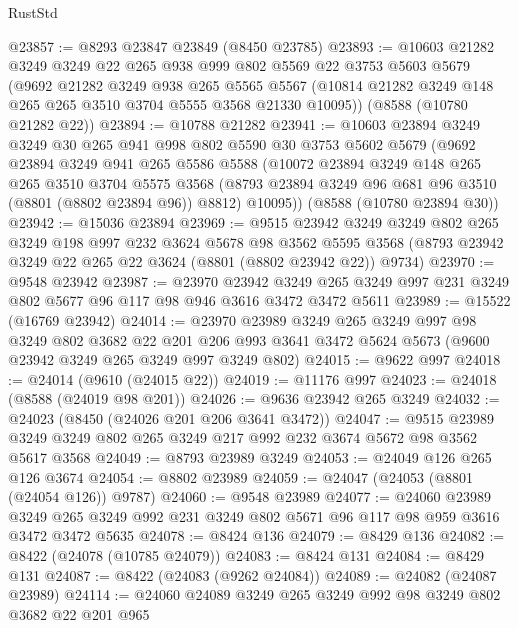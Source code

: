 \begin{lexlean}{RustStd}
\begin{coremodule}
@23857 := @8293 @23847 @23849 (@8450 @23785)
@23893 := @10603
    @21282
    @3249
    @3249
    @22
    @265
    @938
    @999
    @802
    @5569
    @22
    @3753
    @5603
    @5679
    (@9692
      @21282
      @3249
      @938
      @265
      @5565
      @5567
      (@10814 @21282 @3249 @148 @265 @265 @3510 @3704 @5555 @3568 @21330 @10095))
    (@8588 (@10780 @21282 @22))
@23894 := @10788 @21282
@23941 := @10603
    @23894
    @3249
    @3249
    @30
    @265
    @941
    @998
    @802
    @5590
    @30
    @3753
    @5602
    @5679
    (@9692
      @23894
      @3249
      @941
      @265
      @5586
      @5588
      (@10072
        @23894
        @3249
        @148
        @265
        @265
        @3510
        @3704
        @5575
        @3568
        (@8793 @23894 @3249 @96 @681 @96 @3510 (@8801 (@8802 @23894 @96)) @8812)
        @10095))
    (@8588 (@10780 @23894 @30))
@23942 := @15036 @23894
@23969 := @9515
    @23942
    @3249
    @3249
    @802
    @265
    @3249
    @198
    @997
    @232
    @3624
    @5678
    @98
    @3562
    @5595
    @3568
    (@8793 @23942 @3249 @22 @265 @22 @3624 (@8801 (@8802 @23942 @22)) @9734)
@23970 := @9548 @23942
@23987 := @23970
    @23942
    @3249
    @265
    @3249
    @997
    @231
    @3249
    @802
    @5677
    @96
    @117
    @98
    @946
    @3616
    @3472
    @3472
    @5611
@23989 := @15522 (@16769 @23942)
@24014 := @23970
    @23989
    @3249
    @265
    @3249
    @997
    @98
    @3249
    @802
    @3682
    @22
    @201
    @206
    @993
    @3641
    @3472
    @5624
    @5673
    (@9600 @23942 @3249 @265 @3249 @997 @3249 @802)
@24015 := @9622 @997
@24018 := @24014 (@9610 (@24015 @22))
@24019 := @11176 @997
@24023 := @24018 (@8588 (@24019 @98 @201))
@24026 := @9636 @23942 @265 @3249
@24032 := @24023 (@8450 (@24026 @201 @206 @3641 @3472))
@24047 := @9515 @23989 @3249 @3249 @802 @265 @3249 @217 @992 @232 @3674 @5672 @98 @3562 @5617 @3568
@24049 := @8793 @23989 @3249
@24053 := @24049 @126 @265 @126 @3674
@24054 := @8802 @23989
@24059 := @24047 (@24053 (@8801 (@24054 @126)) @9787)
@24060 := @9548 @23989
@24077 := @24060
    @23989
    @3249
    @265
    @3249
    @992
    @231
    @3249
    @802
    @5671
    @96
    @117
    @98
    @959
    @3616
    @3472
    @3472
    @5635
@24078 := @8424 @136
@24079 := @8429 @136
@24082 := @8422 (@24078 (@10785 @24079))
@24083 := @8424 @131
@24084 := @8429 @131
@24087 := @8422 (@24083 (@9262 @24084))
@24089 := @24082 (@24087 @23989)
@24114 := @24060
    @24089
    @3249
    @265
    @3249
    @992
    @98
    @3249
    @802
    @3682
    @22
    @201
    @965

\end{coremodule}
\end{lexlean}
